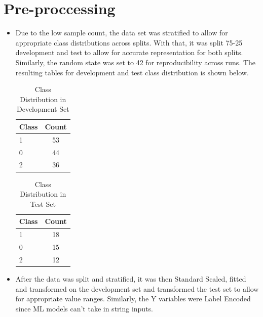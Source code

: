 \documentclass[12pt]{article}
\begin{document}
\section{Pre-proccessing}
\begin{itemize}
    \item Due to the low sample count, the data set was stratified to allow for appropriate class distributions across splits. With that, it was split 75-25 development and test to allow for accurate representation for both splits. Similarly, the random state was set to 42 for reproducibility across runs. The resulting tables for development and test class distribution is shown below.

    \begin{table}[h!]
\centering

\begin{tabular}{lc}
\hline
Class & Count \\
\hline
1     & 53    \\
0     & 44    \\
2     & 36    \\
\hline
\end{tabular}
\caption{Class Distribution in Development Set}
\end{table}

\begin{table}[h!]
\centering

\begin{tabular}{lc}
\hline
Class & Count \\
\hline
1     & 18    \\
0     & 15    \\
2     & 12    \\
\hline
\end{tabular}
\caption{Class Distribution in Test Set}
\end{table}

    \item After the data was split and stratified, it was then Standard Scaled, fitted and transformed on the development set and transformed the test set to allow for appropriate value ranges. Similarly, the Y variables were Label Encoded since ML models can't take in string inputs.
\end{itemize}
\end{document}
